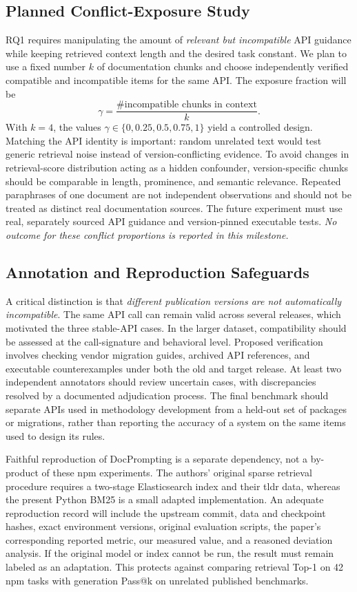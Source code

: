 \documentclass[conference]{IEEEtran}
\begin{document}
\subsection{Planned Conflict-Exposure Study}
RQ1 requires manipulating the amount of \emph{relevant but incompatible} API guidance while keeping retrieved context length and the desired task constant. We plan to use a fixed number $k$ of documentation chunks and choose independently verified compatible and incompatible items for the same API. The exposure fraction will be
\begin{equation}
 \gamma = \frac{\#\text{incompatible chunks in context}}{k}.
\end{equation}
With $k=4$, the values $\gamma\in\{0,0.25,0.5,0.75,1\}$ yield a controlled design. Matching the API identity is important: random unrelated text would test generic retrieval noise instead of version-conflicting evidence. To avoid changes in retrieval-score distribution acting as a hidden confounder, version-specific chunks should be comparable in length, prominence, and semantic relevance. Repeated paraphrases of one document are not independent observations and should not be treated as distinct real documentation sources. The future experiment must use real, separately sourced API guidance and version-pinned executable tests. \emph{No outcome for these conflict proportions is reported in this milestone.}

\subsection{Annotation and Reproduction Safeguards}
A critical distinction is that \emph{different publication versions are not automatically incompatible}. The same API call can remain valid across several releases, which motivated the three stable-API cases. In the larger dataset, compatibility should be assessed at the call-signature and behavioral level. Proposed verification involves checking vendor migration guides, archived API references, and executable counterexamples under both the old and target release. At least two independent annotators should review uncertain cases, with discrepancies resolved by a documented adjudication process. The final benchmark should separate APIs used in methodology development from a held-out set of packages or migrations, rather than reporting the accuracy of a system on the same items used to design its rules.

Faithful reproduction of DocPrompting is a separate dependency, not a by-product of these npm experiments. The authors' original sparse retrieval procedure requires a two-stage Elasticsearch index and their tldr data, whereas the present Python BM25 is a small adapted implementation. An adequate reproduction record will include the upstream commit, data and checkpoint hashes, exact environment versions, original evaluation scripts, the paper's corresponding reported metric, our measured value, and a reasoned deviation analysis. If the original model or index cannot be run, the result must remain labeled as an adaptation. This protects against comparing retrieval Top-1 on 42 npm tasks with generation Pass@k on unrelated published benchmarks.
\end{document}
